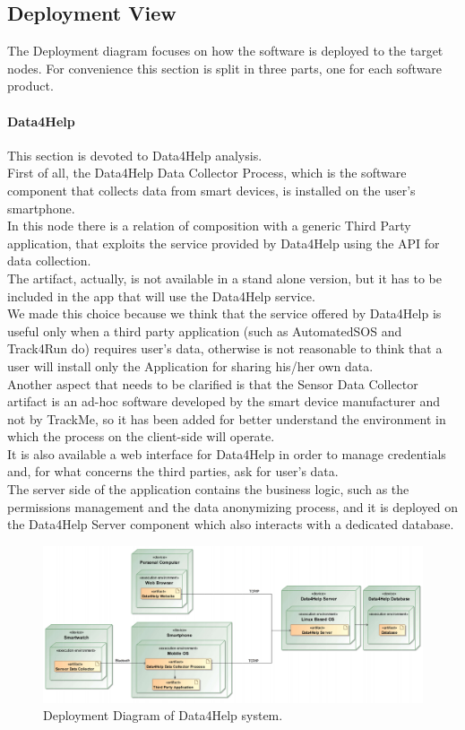 \documentclass[a4paper]{article}
\begin{document}
\subsection{Deployment View}
The Deployment diagram focuses on how the software is deployed to the target nodes. For convenience this section is split in three parts, one for each software product.

\paragraph{Data4Help}
This section is devoted to Data4Help analysis. \\
First of all, the Data4Help Data Collector Process, which is the software component that collects data from smart devices, is installed on the user's smartphone. \\
In this node there is a relation of composition with a generic Third Party application, that exploits the service provided by Data4Help using the API for data collection. \\
The artifact, actually, is not available in a stand alone version, but it has to be included in the app that will use the Data4Help service. \\
We made this choice because we think that the service offered by Data4Help is useful only when a third party application (such as AutomatedSOS and Track4Run do) requires user's data, otherwise is not reasonable to think that a user will install only the Application for sharing his/her own data. \\
Another aspect that needs to be clarified is that the Sensor Data Collector artifact is an ad-hoc software developed by the smart device manufacturer and not by TrackMe, so it has been added for better understand the environment in which the process on the client-side will operate. \\
It is also available a web interface for Data4Help in order to manage credentials and, for what concerns the third parties, ask for user's data. \\
The server side of the application contains the business logic, such as the permissions management and the data anonymizing process, and it is deployed on the Data4Help Server component which also interacts with a dedicated database.

\begin{figure}[H]
    \centering
    \includegraphics[width=\linewidth]{deploymentDiagram-Data4Help}
    \caption{Deployment Diagram of Data4Help system.}
    \label{fig:my_label}
\end{figure}
\end{document}
